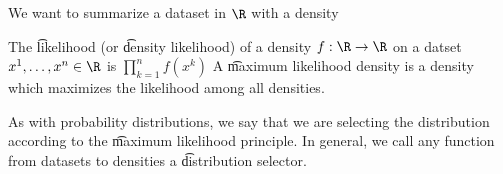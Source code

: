 

We want to summarize a dataset in $\R$ with a density


The \t{likelihood} (or \t{density likelihood}) of a density $f: \R \to \R$ on a datset $x^1, \dots, x^n \in \R$ is $\prod_{k = 1}^{n} f(x^k)$
A \t{maximum likelihood density} is a density which maximizes the likelihood among all densities.

As with probability distributions, we say that we are selecting the distribution according to the \t{maximum likelihood principle}.
In general, we call any function from datasets to densities a \t{distribution selector}.

\blankpage
